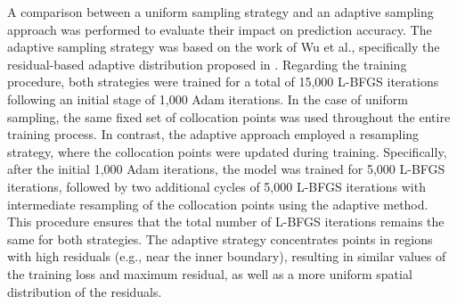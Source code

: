 \documentclass[11pt,twoside]{article}
\begin{document}
A comparison between a uniform sampling strategy and an adaptive sampling approach was performed to evaluate their impact on prediction accuracy. The adaptive sampling strategy was based on the work of Wu et al., specifically the residual-based adaptive distribution proposed in \cite{wu_comprehensive_2022}. Regarding the training procedure, both strategies were trained for a total of 15,000 L-BFGS iterations following an initial stage of 1,000 Adam iterations. In the case of uniform sampling, the same fixed set of collocation points was used throughout the entire training process. In contrast, the adaptive approach employed a resampling strategy, where the collocation points were updated during training. Specifically, after the initial 1,000 Adam iterations, the model was trained for 5,000 L-BFGS iterations, followed by two additional cycles of 5,000 L-BFGS iterations with intermediate resampling of the collocation points using the adaptive method.\\

This procedure ensures that the total number of L-BFGS iterations remains the same for both strategies. The adaptive strategy concentrates points in regions with high residuals (e.g., near the inner boundary), resulting in similar values of the training loss and maximum residual, as well as a more uniform spatial distribution of the residuals.\\


\end{document}
